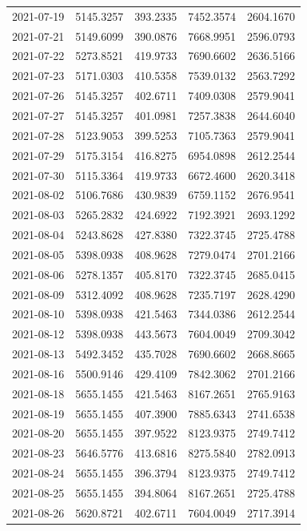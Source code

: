 \begin{footnotesize}
\begin{longtable}{lllll}
2021-07-19 & 5145.3257 & 393.2335 & 7452.3574 & 2604.1670 \\
2021-07-21 & 5149.6099 & 390.0876 & 7668.9951 & 2596.0793 \\
2021-07-22 & 5273.8521 & 419.9733 & 7690.6602 & 2636.5166 \\
2021-07-23 & 5171.0303 & 410.5358 & 7539.0132 & 2563.7292 \\
2021-07-26 & 5145.3257 & 402.6711 & 7409.0308 & 2579.9041 \\
2021-07-27 & 5145.3257 & 401.0981 & 7257.3838 & 2644.6040 \\
2021-07-28 & 5123.9053 & 399.5253 & 7105.7363 & 2579.9041 \\
2021-07-29 & 5175.3154 & 416.8275 & 6954.0898 & 2612.2544 \\
2021-07-30 & 5115.3364 & 419.9733 & 6672.4600 & 2620.3418 \\
2021-08-02 & 5106.7686 & 430.9839 & 6759.1152 & 2676.9541 \\
2021-08-03 & 5265.2832 & 424.6922 & 7192.3921 & 2693.1292 \\
2021-08-04 & 5243.8628 & 427.8380 & 7322.3745 & 2725.4788 \\
2021-08-05 & 5398.0938 & 408.9628 & 7279.0474 & 2701.2166 \\
2021-08-06 & 5278.1357 & 405.8170 & 7322.3745 & 2685.0415 \\
2021-08-09 & 5312.4092 & 408.9628 & 7235.7197 & 2628.4290 \\
2021-08-10 & 5398.0938 & 421.5463 & 7344.0386 & 2612.2544 \\
2021-08-12 & 5398.0938 & 443.5673 & 7604.0049 & 2709.3042 \\
2021-08-13 & 5492.3452 & 435.7028 & 7690.6602 & 2668.8665 \\
2021-08-16 & 5500.9146 & 429.4109 & 7842.3062 & 2701.2166 \\
2021-08-18 & 5655.1455 & 421.5463 & 8167.2651 & 2765.9163 \\
2021-08-19 & 5655.1455 & 407.3900 & 7885.6343 & 2741.6538 \\
2021-08-20 & 5655.1455 & 397.9522 & 8123.9375 & 2749.7412 \\
2021-08-23 & 5646.5776 & 413.6816 & 8275.5840 & 2782.0913 \\
2021-08-24 & 5655.1455 & 396.3794 & 8123.9375 & 2749.7412 \\
2021-08-25 & 5655.1455 & 394.8064 & 8167.2651 & 2725.4788 \\
2021-08-26 & 5620.8721 & 402.6711 & 7604.0049 & 2717.3914 \\

\end{longtable}
\end{footnotesize}

